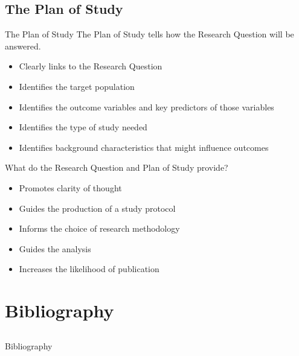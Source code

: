 \documentclass[14pt]{beamer}
\begin{document}
\subsection{The Plan of Study}

\begin{frame}{The Plan of Study}
The Plan of Study tells how the Research Question will be answered.
\begin{itemize}
\item Clearly links to the Research Question
\item Identifies the target population
\item Identifies the outcome variables and key predictors of those variables
\item Identifies the type of study needed
\item Identifies background characteristics that might influence outcomes
\end{itemize}
\end{frame}

\begin{frame}{What do the Research Question and Plan of Study provide?}
\begin{itemize}
\item Promotes clarity of thought
\item Guides the production of a study protocol
\item Informs the choice of research methodology
\item Guides the analysis
\item Increases the likelihood of publication
\end{itemize}
\end{frame}

\section{Bibliography}

\subsection*{}

\begin{frame}[allowframebreaks]{Bibliography}


\end{frame}
\end{document}

